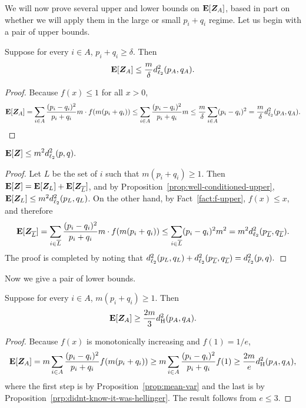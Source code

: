 We will now prove several upper and lower bounds on $\mbox{\bf E}[\boldsymbol{Z}_A]$,
based in part on whether we will apply them in the large or small $p_i + q_i$ regime.
Let us begin with a pair of upper bounds.

\begin{proposition}\label{prop:well-conditioned-upper}
Suppose for every $i \in A$, $p_i + q_i \geq \delta$. Then
\begin{equation*}
\mbox{\bf E}[\boldsymbol{Z}_A] \leq \frac{m}{\delta} d_{\ell_2}^2(p_A, q_A).
\end{equation*}
\end{proposition}
\begin{proof}
Because $f(x) \leq 1$ for all $x > 0$,
\begin{equation*}
\mbox{\bf E}[\boldsymbol{Z}_A]
= \sum_{i \in A} \frac{(p_i-q_i)^2}{p_i+q_i} m \cdot f(m(p_i + q_i))
\leq  \sum_{i \in A} \frac{(p_i-q_i)^2}{p_i+q_i} m
\leq \frac{m}{\delta} \sum_{i \in A} (p_i-q_i)^2
=  \frac{m}{\delta} d_{\ell_2}^2(p_A, q_A).\qedhere
\end{equation*}
\end{proof}

\begin{proposition}\label{prop:general-upper}
$\displaystyle
\mbox{\bf E}[\boldsymbol{Z}] \leq m^2 d_{\ell_2}^2(p, q).
$
\end{proposition}
\begin{proof}
Let $L$ be the set of $i$ such that $m(p_i + q_i) \geq 1$.
Then $\mbox{\bf E}[\boldsymbol{Z}] = \mbox{\bf E}[\boldsymbol{Z}_L] + \mbox{\bf E}[\boldsymbol{Z}_{\overline{L}}]$, and by Proposition~\ref{prop:well-conditioned-upper},
$\mbox{\bf E}[\boldsymbol{Z}_L] \leq m^2 d_{\ell_2}^2(p_L, q_L)$.
On the other hand, by Fact~\ref{fact:f-upper}, $f(x) \leq x$, and therefore
\begin{equation*}
\mbox{\bf E}[\boldsymbol{Z}_{\overline{L}}]
= \sum_{i \in \overline{L}} \frac{(p_i-q_i)^2}{p_i+q_i} m \cdot f(m(p_i + q_i))
\leq \sum_{i \in \overline{L}} (p_i-q_i)^2 m^2
= m^2 d_{\ell_2}^2(p_{\overline{L}}, q_{\overline{L}}).
\end{equation*}
The proof is completed by noting that $d_{\ell_2}^2(p_L, q_L) + d_{\ell_2}^2(p_{\overline{L}}, q_{\overline{L}}) = d_{\ell_2}^2(p, q).$
\end{proof}

Now we give a pair of lower bounds.

\begin{proposition}\label{prop:pretty-much-a-trivial-lower-bound-i-dont-know-what-to-tell-you}
Suppose for every $i \in A$, $m(p_i + q_i) \geq 1$.  Then
\begin{equation*}
\mbox{\bf E}[\boldsymbol{Z}_A] \geq \frac{2m}{3} d_{\mathrm {H}}^2(p_A,q_A).
\end{equation*}
\end{proposition}
\begin{proof}
Because $f(x)$ is monotonically increasing and $f(1) = 1/e$,
\begin{equation*}
\mbox{\bf E}[\boldsymbol{Z}_A]
= m \sum_{i \in A} \frac{(p_i-q_i)^2}{p_i+q_i} f(m(p_i+q_i))
\geq m \sum_{i \in A} \frac{(p_i-q_i)^2}{p_i+q_i} f(1)
\geq \frac{2m}{e}d_{\mathrm {H}}^2(p_A,q_A),
\end{equation*}
where the first step is by Proposition~\ref{prop:mean-var} and the last is by Proposition~\ref{prp:didnt-know-it-was-hellinger}.
The result follows from $e \leq 3$.
\end{proof}

